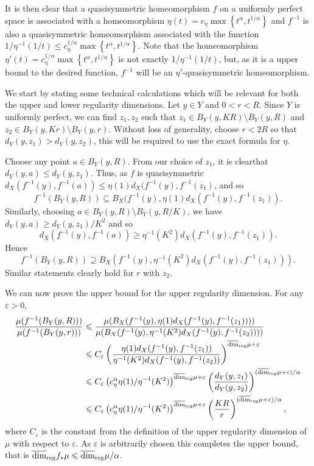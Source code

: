 It is then clear that a quasisymmetric homeomorphism $f$ on a uniformly perfect space is associated with a homeomorphism $\eta(t) = c_\eta\max\left\{t^\alpha, t^{1/\alpha}\right\}$ and $f^{-1}$ is also a quasisymmetric homeomorphism associated with the function $1/\eta^{-1}(1/t) \le c_\eta^{1/\alpha} \max\left\{t^\alpha, t^{1/\alpha} \right\}$. Note that the homeomorphism $\eta'(t) = c_\eta^{1/\alpha} \max\left\{t^\alpha, t^{1/\alpha} \right\}$ is not exactly $1/\eta^{-1}(1/t)$, but, as it is a upper bound to the desired function, $f^{-1}$ will be an $\eta'$-quasisymmetric homeomorphism.



We start by stating some technical calculations which will be relevant for both the upper and lower regularity dimensions. Let $y\in Y$ and $0<r<R$. Since $Y$ is uniformly perfect, we can find $z_1,z_2$ such that $z_1\in B_Y(y,KR) \setminus B_Y(y,R)$ and $z_2 \in B_Y(y,Kr) \setminus B_Y(y,r)$. Without loss of generality, choose $ r < 2R $ so that $d_Y(y,z_1) > d_Y(y,z_2)$,  this will be required to use the exact formula for $\eta$.
	
	
Choose any point $a \in B_Y(y,R)$. From our choice of $z_1$, it is clearthat$d_Y( y , a ) \le d_Y(y , z_1)$. Thus, as $f$ is quasisymmetric $d_X( f^{-1}(y) , f^{-1}(a) ) \le \eta(1)  d_X(f^{-1}(y) , f^{-1}(z_1) $, and so 
	\[
f^{-1}(B_Y(y,R)) \subseteq B_X(f^{-1}(y),\eta(1)d_X(f^{-1}(y), f^{-1}(z_1)).
	\]
Similarly, choosing $a \in B_Y(y,R) \setminus B_Y(y,R/K)$, we have $d_Y( y , a ) \ge d_Y( y , z_1 )/K^2$ and so $$d_X( f^{-1}(y) , f^{-1}(a) ) \ge \eta^{-1}(K^2) d_X( f^{-1}(y) , f^{-1}(z_1) ).$$
Hence 
\[
f^{-1}(B_Y(y,R)) \supseteq B_X(f^{-1}(y),\eta^{-1}(K^2)d_X(f^{-1}(y),f^{-1}(z_1))).
\]
Similar statements clearly hold for $r$ with $z_2$. 

We can now prove the upper bound for the upper regularity dimension. For any $\varepsilon > 0$,
\begin{align*}
\frac{\mu(f^{-1}(B_Y(y,R)))}{\mu(f^{-1}(B_Y(y,r)))} &\leqslant \frac{\mu(B_X(f^{-1}(y),\eta(1)d_X(f^{-1}(y), f^{-1}(z_1)) ))}{\mu(B_X(f^{-1}(y),\eta^{-1}(K^2)d_X(f^{-1}(y),f^{-1}(z_2)) ))} \\
& \leqslant C_{\varepsilon}\left( \frac{\eta(1)d_X(f^{-1}(y),f^{-1}(z_1))}{\eta^{-1}(K^2)d_X(f^{-1}(y),f^{-1}(z_2))}\right)^{\overline{\dim}_{\textup{reg}} \mu + \varepsilon} \\
& \leqslant C_{\varepsilon}\left(c_\eta^{\alpha} \eta(1)/\eta^{-1}(K^2)\right)^{\overline{\dim}_{\textup{reg}} \mu + \varepsilon} \left(\frac{d_Y(y,z_1)}{d_Y(y,z_2)} \right)^{(\overline{\dim}_{\textup{reg}} \mu + \varepsilon)  / \alpha} \\
& \leqslant C_{\varepsilon}\left(c_\eta^{\alpha} \eta(1)/\eta^{-1}(K^2)\right)^{\overline{\dim}_{\textup{reg}} \mu + \varepsilon} \left(\frac{KR}{r} \right)^{(\overline{\dim}_{\textup{reg}} \mu +\varepsilon)/ \alpha},
\end{align*}
where $C_{\varepsilon}$ is the constant from the definition of the upper regularity dimension of $\mu$ with respect to $\varepsilon$. As $\varepsilon$ is arbitrarily chosen this completes the upper bound, that is $\overline{\dim}_{\textup{reg}} f_*\mu \leqslant \overline{\dim}_{\textup{reg}} \mu / \alpha$.
	
